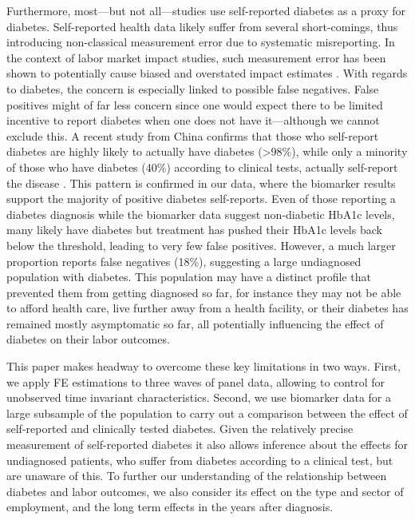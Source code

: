 \documentclass[12pt,english]{article}
\begin{document}
Furthermore, most---but not all---studies use self-reported diabetes as a proxy for diabetes. Self-reported health data likely suffer from  several short-comings, thus introducing non-classical measurement error due to systematic misreporting. In the context of labor market impact studies, such measurement error has been shown to potentially cause biased and overstated impact estimates \parencite{Cawley2015,ONeill2013,Perks2015}.  With regards to diabetes, the concern is especially linked to possible false negatives. False positives might of far less concern since one would expect there to be limited incentive to report diabetes when one does not have it---although we cannot exclude this.  A recent study from China confirms that those who self-report diabetes are highly likely to actually have diabetes (>98\%), while only a minority of those who have diabetes (40\%) according to clinical tests, actually self-report the disease \parencite{Yuan2015}. This pattern is confirmed in our data, where the biomarker results support the majority of positive diabetes self-reports. Even of those reporting a diabetes diagnosis while the biomarker data suggest non-diabetic \ac{HbA1c} levels, many likely have diabetes but treatment has pushed their \ac{HbA1c} levels back below the threshold, leading to very few false positives.  However, a much larger proportion reports false negatives (18\%), suggesting a large undiagnosed population with diabetes. This population may have a distinct profile that prevented them from getting diagnosed so far, for instance they may not be able to afford health care, live further away from a health facility,  or their diabetes has remained mostly asymptomatic so far, all potentially influencing the effect of diabetes on their labor outcomes.

This paper makes headway to overcome these key limitations in two ways.  First, we apply \acf{FE} estimations to three waves of panel data, allowing to control for unobserved time invariant characteristics.  Second, we use biomarker data for a large subsample of the population to carry out a comparison between the effect of self-reported and clinically tested diabetes. Given the relatively precise measurement of self-reported diabetes it also allows inference about the effects for undiagnosed patients, who suffer from diabetes according to a clinical test, but are unaware of this. To further our understanding of the relationship between diabetes and labor outcomes, we also consider its effect on the type and sector of employment, and the long term effects in the years after diagnosis.
\end{document}
